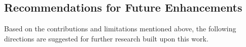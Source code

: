 


\subsection{Recommendations for Future Enhancements}
\label{sec:conclusion_future_work}

Based on the contributions and limitations mentioned above, the following directions are suggested for further research built upon this work.



